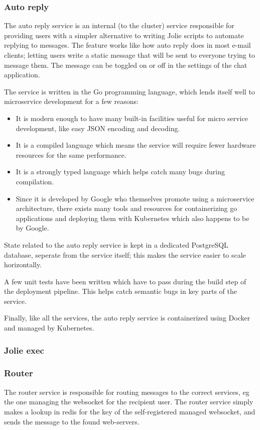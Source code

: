 \subsubsection{Auto reply}
The auto reply service is an internal (to the cluster) service responsible for providing users with a simpler alternative to writing Jolie scripts to automate replying to messages. The feature works like how auto reply does in most e-mail clients; letting users write a static message that will be sent to everyone trying to message them. The message can be toggled on or off in the settings of the chat application.

The service is written in the Go programming language, which lends itself well to microservice development for a few reasons:

\begin{itemize}
	\item It is modern enough to have many built-in facilities useful for micro service development, like easy JSON encoding and decoding.
	\item It is a compiled language which means the service will require fewer hardware resources for the same performance.
	\item It is a strongly typed language which helps catch many bugs during compilation.
	\item Since it is developed by Google who themselves promote using a microservice architecture\cite{googlePromoteMicroservices}, there exists many tools and resources for containerizing go applications and deploying them with Kubernetes which also happens to be by Google.
\end{itemize}

State related to the auto reply service is kept in a dedicated PostgreSQL database, seperate from the service itself; this makes the service easier to scale horizontally.\cite{xenonStateless}

A few unit tests have been written which have to pass during the build step of the deployment pipeline. This helps catch semantic bugs in key parts of the service.

Finally, like all the services, the auto reply service is containerized using Docker and managed by Kubernetes.

\subsubsection{Jolie exec}
\subsubsection{Router}
The router service is responsible for routing messages to the correct services, eg the one managing the websocket for the recipient user.
The router service simply makes a lookup in redis for the key of the self-registered managed websocket, and sends the message to the found web-servers.
